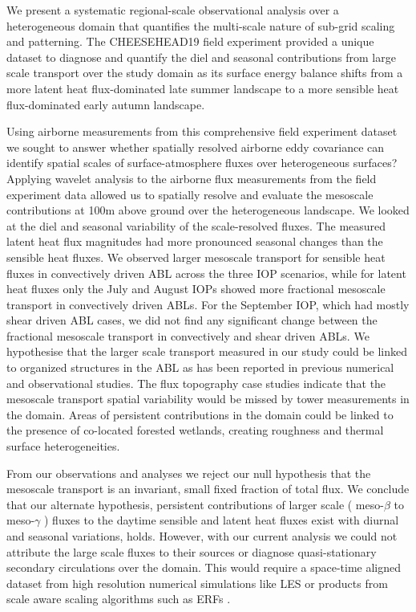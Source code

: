 \documentclass[draft]{agujournal2019}
\begin{document}
We present a systematic regional-scale observational analysis over a heterogeneous domain that quantifies the multi-scale nature of sub-grid scaling and patterning. The CHEESEHEAD19 field experiment provided a unique dataset to diagnose and quantify the diel and seasonal contributions from large scale transport over the study domain as its surface energy balance  shifts from a more latent heat flux-dominated late summer landscape to a more sensible heat flux-dominated early autumn landscape.

Using airborne measurements from this comprehensive field experiment dataset we sought to answer whether spatially resolved airborne eddy covariance can identify spatial scales of surface-atmosphere fluxes over heterogeneous surfaces?  Applying wavelet analysis to the airborne flux measurements from the field experiment data allowed us to spatially resolve and evaluate the mesoscale contributions at 100m above ground over the heterogeneous landscape. We looked at the diel and seasonal variability of the scale-resolved fluxes. The measured latent heat flux magnitudes had more pronounced seasonal changes than the sensible heat fluxes. We observed larger mesoscale transport for sensible heat fluxes in convectively driven ABL across the three IOP scenarios, while for latent heat fluxes only the July and August IOPs showed more fractional mesoscale transport in convectively driven ABLs. For the September IOP, which had mostly shear driven ABL cases, we did not find any significant change between the fractional mesoscale transport in convectively and shear driven ABLs. We hypothesise that the larger scale transport measured in our study could be linked to organized structures in the ABL as has been reported in previous numerical \cite{kanda_les_2004, inagaki_impact_2006, salesky_coherent_2020, margairaz_surface_2020} and observational \cite{eder_mesoscale_2015, morrison_impact_2021} studies. The flux topography case studies indicate that the mesoscale transport spatial variability would be missed by tower measurements in the domain. Areas of persistent contributions in the domain could be linked to the presence of co-located forested wetlands, creating roughness and thermal surface heterogeneities. 

From our observations and analyses we reject our null hypothesis that the mesoscale transport is an invariant, small fixed fraction of total flux. We conclude that our alternate hypothesis, persistent contributions of larger scale ( meso-$\beta$ to meso-$\gamma$ ) fluxes to the daytime sensible and latent heat fluxes exist with diurnal and seasonal variations, holds. However, with our current analysis we could not attribute the large scale fluxes to their sources or diagnose  quasi-stationary secondary circulations over the domain. This would require a space-time aligned dataset from high resolution numerical simulations like LES or products from scale aware scaling algorithms such as ERFs \cite{metzger_spatially_2013}.
\end{document}
